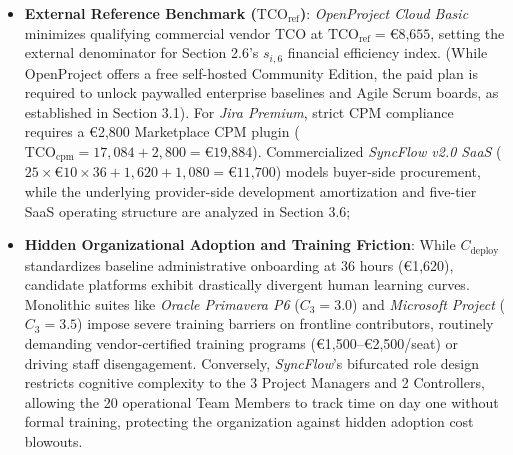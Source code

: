 \begin{itemize}[itemsep=1pt,topsep=1pt]
    \item \textbf{External Reference Benchmark ($\text{TCO}_{\text{ref}}$)}: \textit{OpenProject Cloud Basic} minimizes qualifying commercial vendor TCO at $\text{TCO}_{\text{ref}} = \text{€8,655}$, setting the external denominator for Section 2.6's $s_{i,6}$ financial efficiency index. (While OpenProject offers a free self-hosted Community Edition, the paid plan is required to unlock paywalled enterprise baselines and Agile Scrum boards, as established in Section 3.1). For \textit{Jira Premium}, strict CPM compliance requires a €2,800 Marketplace CPM plugin ($\text{TCO}_{\text{cpm}} = 17,084 + 2,800 = \text{€19,884}$). Commercialized \textit{SyncFlow v2.0 SaaS} ($25 \times \text{€10} \times 36 + 1,620 + 1,080 = \text{€11,700}$) models buyer-side procurement, while the underlying provider-side development amortization and five-tier SaaS operating structure are analyzed in Section 3.6;

    \vspace{1mm}

    \item \textbf{Hidden Organizational Adoption and Training Friction}: While $C_{\text{deploy}}$ standardizes baseline administrative onboarding at 36 hours (€1,620), candidate platforms exhibit drastically divergent human learning curves. Monolithic suites like \textit{Oracle Primavera P6} ($C_3=3.0$) and \textit{Microsoft Project} ($C_3=3.5$) impose severe training barriers on frontline contributors, routinely demanding vendor-certified training programs (€1,500--€2,500/seat) or driving staff disengagement. Conversely, \textit{SyncFlow}'s bifurcated role design restricts cognitive complexity to the 3 Project Managers and 2 Controllers, allowing the 20 operational Team Members to track time on day one without formal training, protecting the organization against hidden adoption cost blowouts.
\end{itemize}

